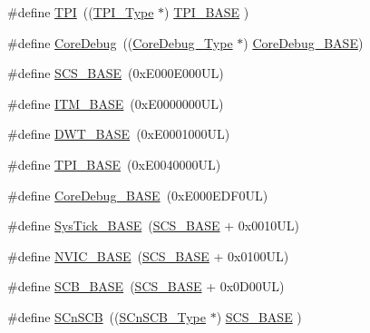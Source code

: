 \begin{DoxyCompactItemize}
\item 
\#define \mbox{\hyperlink{group___c_m_s_i_s__core__base_ga8b4dd00016aed25a0ea54e9a9acd1239}{T\+PI}}~((\mbox{\hyperlink{struct_t_p_i___type}{T\+P\+I\+\_\+\+Type}}       $\ast$)     \mbox{\hyperlink{group___c_m_s_i_s__core__base_ga2b1eeff850a7e418844ca847145a1a68}{T\+P\+I\+\_\+\+B\+A\+SE}}      )
\item 
\#define \mbox{\hyperlink{group___c_m_s_i_s__core__base_gab6e30a2b802d9021619dbb0be7f5d63d}{Core\+Debug}}~((\mbox{\hyperlink{struct_core_debug___type}{Core\+Debug\+\_\+\+Type}} $\ast$)     \mbox{\hyperlink{group___c_m_s_i_s__core__base_ga680604dbcda9e9b31a1639fcffe5230b}{Core\+Debug\+\_\+\+B\+A\+SE}})
\item 
\#define \mbox{\hyperlink{group___c_m_s_i_s__core__base_ga3c14ed93192c8d9143322bbf77ebf770}{S\+C\+S\+\_\+\+B\+A\+SE}}~(0x\+E000\+E000\+U\+L)
\item 
\#define \mbox{\hyperlink{group___c_m_s_i_s__core__base_gadd76251e412a195ec0a8f47227a8359e}{I\+T\+M\+\_\+\+B\+A\+SE}}~(0x\+E0000000\+U\+L)
\item 
\#define \mbox{\hyperlink{group___c_m_s_i_s__core__base_gafdab534f961bf8935eb456cb7700dcd2}{D\+W\+T\+\_\+\+B\+A\+SE}}~(0x\+E0001000\+U\+L)
\item 
\#define \mbox{\hyperlink{group___c_m_s_i_s__core__base_ga2b1eeff850a7e418844ca847145a1a68}{T\+P\+I\+\_\+\+B\+A\+SE}}~(0x\+E0040000\+U\+L)
\item 
\#define \mbox{\hyperlink{group___c_m_s_i_s__core__base_ga680604dbcda9e9b31a1639fcffe5230b}{Core\+Debug\+\_\+\+B\+A\+SE}}~(0x\+E000\+E\+D\+F0\+U\+L)
\item 
\#define \mbox{\hyperlink{group___c_m_s_i_s__core__base_ga58effaac0b93006b756d33209e814646}{Sys\+Tick\+\_\+\+B\+A\+SE}}~(\mbox{\hyperlink{group___c_m_s_i_s__core__base_ga3c14ed93192c8d9143322bbf77ebf770}{S\+C\+S\+\_\+\+B\+A\+SE}} +  0x0010\+U\+L)
\item 
\#define \mbox{\hyperlink{group___c_m_s_i_s__core__base_gaa0288691785a5f868238e0468b39523d}{N\+V\+I\+C\+\_\+\+B\+A\+SE}}~(\mbox{\hyperlink{group___c_m_s_i_s__core__base_ga3c14ed93192c8d9143322bbf77ebf770}{S\+C\+S\+\_\+\+B\+A\+SE}} +  0x0100\+U\+L)
\item 
\#define \mbox{\hyperlink{group___c_m_s_i_s__core__base_gad55a7ddb8d4b2398b0c1cfec76c0d9fd}{S\+C\+B\+\_\+\+B\+A\+SE}}~(\mbox{\hyperlink{group___c_m_s_i_s__core__base_ga3c14ed93192c8d9143322bbf77ebf770}{S\+C\+S\+\_\+\+B\+A\+SE}} +  0x0\+D00\+U\+L)
\item 
\#define \mbox{\hyperlink{group___c_m_s_i_s__core__base_ga9fe0cd2eef83a8adad94490d9ecca63f}{S\+Cn\+S\+CB}}~((\mbox{\hyperlink{struct_s_cn_s_c_b___type}{S\+Cn\+S\+C\+B\+\_\+\+Type}}    $\ast$)     \mbox{\hyperlink{group___c_m_s_i_s__core__base_ga3c14ed93192c8d9143322bbf77ebf770}{S\+C\+S\+\_\+\+B\+A\+SE}}      )

\end{DoxyCompactItemize}
